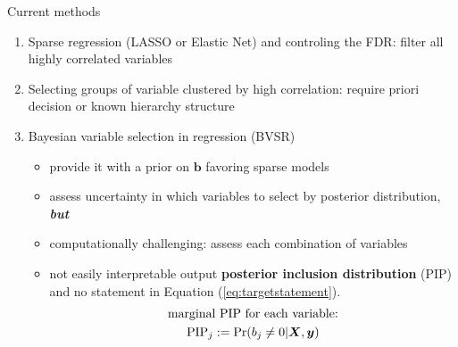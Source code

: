\documentclass[10pt]{beamer}
\begin{document}
\begin{frame}{Current methods}
    \begin{enumerate}
        \item Sparse regression (LASSO or Elastic Net) and controling the FDR: filter all highly correlated variables
        \item Selecting groups of variable clustered by high correlation: require priori decision or known hierarchy structure
        \item Bayesian variable selection in regression (BVSR)
        \begin{itemize}
            \item provide it with a prior on $\bm{b}$ favoring sparse models
            \item assess uncertainty in which variables to select by posterior distribution, \textbf{\textit{but}}
            \medskip
            \item computationally challenging: assess each combination of variables
            \item not easily interpretable output \textbf{posterior inclusion distribution} (PIP) and no statement in Equation (\ref{eq:targetstatement}).
            \begin{gather}
                \text{marginal PIP for each variable:}\notag\\
                \text{PIP}_j:=\text{Pr}(b_j\neq 0|\bm{X},\bm{y}) \label{eq:marginalstatement}
            \end{gather}
        \end{itemize}
    \end{enumerate}
\end{frame}
\end{document}
